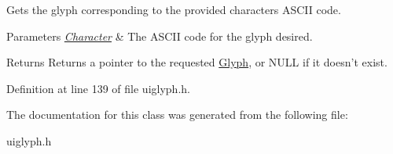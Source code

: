 Gets the glyph corresponding to the provided characters ASCII code. 


\begin{DoxyParams}{Parameters}
{\em \hyperlink{structMezzanine_1_1UI_1_1Character}{Character}} & The ASCII code for the glyph desired. \\
\hline
\end{DoxyParams}
\begin{DoxyReturn}{Returns}
Returns a pointer to the requested \hyperlink{classMezzanine_1_1UI_1_1Glyph}{Glyph}, or NULL if it doesn't exist. 
\end{DoxyReturn}


Definition at line 139 of file uiglyph.h.



The documentation for this class was generated from the following file:\begin{DoxyCompactItemize}
\item 
uiglyph.h\end{DoxyCompactItemize}
